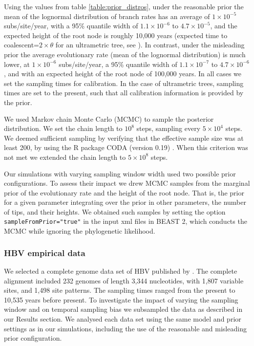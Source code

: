 \documentclass[11pt]{article}
\begin{document}
Using the values from table \ref{table:prior_distros}, under the reasonable prior the mean of the lognormal distribution of branch rates has an average of $1\times 10^{-5}$ subs/site/year, with a 95\% quantile width of $1.1\times 10^{-6}$ to $4.7\times10^{-5}$, and the expected height of the root node is roughly 10,000 years (expected time to coalescent=$2\times \theta$ for an ultrametric tree, see \cite{nordborg2019coalescent}). In contrast, under the misleading prior the average evolutionary rate (mean of the lognormal distribution) is much lower, at $1\times10^{-6}$ subs/site/year, a 95\% quantile width of $1.1\times10^{-7}$ to $4.7\times10^{-6}$, and with an expected height of the root node of 100,000 years. In all cases we set the sampling times for calibration. In the case of ultrametric trees, sampling times are set to the present, such that all calibration information is provided by the prior.

We used Markov chain Monte Carlo (MCMC) to sample the posterior distribution. We set the chain length to $10^{8}$ steps, sampling every $5\times10^{4}$ steps. We deemed sufficient sampling by verifying that the effective sample size was at least 200, by using the R package CODA (version 0.19) \citep{plummer2006coda}. When this criterion was not met we extended the chain length to $5\times10^{8}$ steps. 

Our simulations with varying sampling window width used two possible prior configurations. To assess their impact we drew MCMC samples from the marginal prior of the evolutionary rate and the height of the root node. That is, the prior for a given parameter integrating over the prior in other parameters, the number of tips, and their heights. We obtained such samples by setting the option \texttt{sampleFromPrior="true"} in the input xml files in BEAST 2, which conducts the MCMC while ignoring the phylogenetic likelihood.

\subsubsection{HBV empirical data}
We selected a complete genome data set of HBV published by \cite{kocher2021ten}. The complete alignment included 232 genomes of length 3,344 nucleotides, with 1,807 variable sites, and 1,498 site patterns. The sampling times ranged from the present to 10,535 years before present. To investigate the impact of varying the sampling window and on temporal sampling bias we subsampled the data as described in our Results section. We analysed each data set using the same model and prior settings as in our simulations, including the use of the reasonable and misleading prior configuration.
\end{document}
